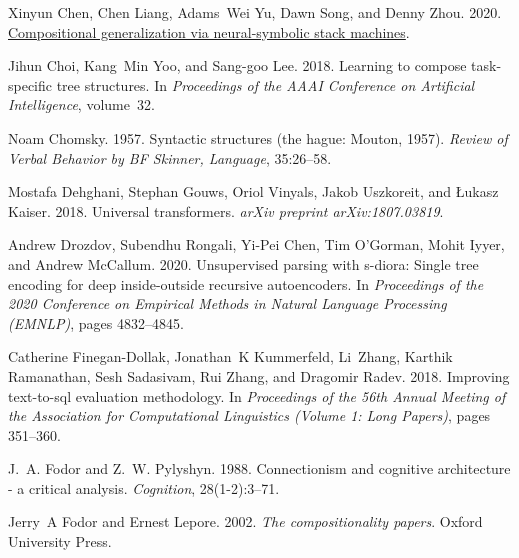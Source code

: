 \documentclass[11pt,a4paper]{article}
\begin{document}
\begin{thebibliography}{57}
Xinyun Chen, Chen Liang, Adams~Wei Yu, Dawn Song, and Denny Zhou. 2020.
\newblock \href {http://arxiv.org/abs/2008.06662} {Compositional generalization
  via neural-symbolic stack machines}.

Jihun Choi, Kang~Min Yoo, and Sang-goo Lee. 2018.
\newblock Learning to compose task-specific tree structures.
\newblock In \emph{Proceedings of the AAAI Conference on Artificial
  Intelligence}, volume~32.

Noam Chomsky. 1957.
\newblock Syntactic structures (the hague: Mouton, 1957).
\newblock \emph{Review of Verbal Behavior by BF Skinner, Language}, 35:26--58.

Mostafa Dehghani, Stephan Gouws, Oriol Vinyals, Jakob Uszkoreit, and {\L}ukasz
  Kaiser. 2018.
\newblock Universal transformers.
\newblock \emph{arXiv preprint arXiv:1807.03819}.

Andrew Drozdov, Subendhu Rongali, Yi-Pei Chen, Tim O’Gorman, Mohit Iyyer, and
  Andrew McCallum. 2020.
\newblock Unsupervised parsing with s-diora: Single tree encoding for deep
  inside-outside recursive autoencoders.
\newblock In \emph{Proceedings of the 2020 Conference on Empirical Methods in
  Natural Language Processing (EMNLP)}, pages 4832--4845.

Catherine Finegan-Dollak, Jonathan~K Kummerfeld, Li~Zhang, Karthik Ramanathan,
  Sesh Sadasivam, Rui Zhang, and Dragomir Radev. 2018.
\newblock Improving text-to-sql evaluation methodology.
\newblock In \emph{Proceedings of the 56th Annual Meeting of the Association
  for Computational Linguistics (Volume 1: Long Papers)}, pages 351--360.

J.~A. Fodor and Z.~W. Pylyshyn. 1988.
\newblock Connectionism and cognitive architecture - a critical analysis.
\newblock \emph{Cognition}, 28(1-2):3--71.

Jerry~A Fodor and Ernest Lepore. 2002.
\newblock \emph{The compositionality papers}.
\newblock Oxford University Press.


\end{thebibliography}
\end{document}
